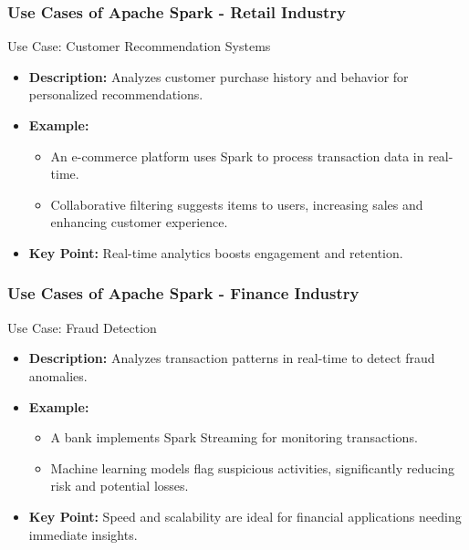 \documentclass[aspectratio=169]{beamer}
\begin{document}
\begin{frame}[fragile]
    \frametitle{Use Cases of Apache Spark - Retail Industry}
    \begin{block}{Use Case: Customer Recommendation Systems}
        \begin{itemize}
            \item \textbf{Description:} Analyzes customer purchase history and behavior for personalized recommendations.
            \item \textbf{Example:} 
                \begin{itemize}
                    \item An e-commerce platform uses Spark to process transaction data in real-time.
                    \item Collaborative filtering suggests items to users, increasing sales and enhancing customer experience.
                \end{itemize}
            \item \textbf{Key Point:} Real-time analytics boosts engagement and retention.
        \end{itemize}
    \end{block}
\end{frame}

\begin{frame}[fragile]
    \frametitle{Use Cases of Apache Spark - Finance Industry}
    \begin{block}{Use Case: Fraud Detection}
        \begin{itemize}
            \item \textbf{Description:} Analyzes transaction patterns in real-time to detect fraud anomalies.
            \item \textbf{Example:} 
                \begin{itemize}
                    \item A bank implements Spark Streaming for monitoring transactions.
                    \item Machine learning models flag suspicious activities, significantly reducing risk and potential losses.
                \end{itemize}
            \item \textbf{Key Point:} Speed and scalability are ideal for financial applications needing immediate insights.
        \end{itemize}
    \end{block}
\end{frame}
\end{document}
